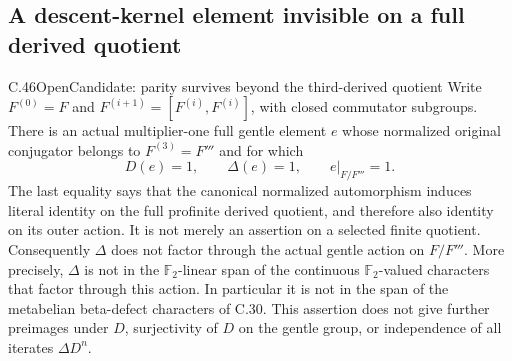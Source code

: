 \subsection{A descent-kernel element invisible on a full derived quotient}

\begin{statement}{C.46}{Open}{Candidate: parity survives beyond the third-derived quotient}
Write $F^{(0)}=F$ and $F^{(i+1)}=[F^{(i)},F^{(i)}]$, with
closed commutator subgroups. There is an actual multiplier-one full
gentle element $e$ whose normalized original conjugator belongs to
$F^{(3)}=F'''$ and for which
\[
 D(e)=1,\qquad \Delta(e)=1,\qquad
 e|_{F/F'''}=1.                                      \tag{C.46.1}
\]
The last equality says that the canonical normalized automorphism induces
literal identity on the full profinite derived quotient, and therefore
also identity on its outer action. It is not merely an assertion on a
selected finite quotient. Consequently $\Delta$ does not factor through
the actual gentle action on $F/F'''$. More precisely, $\Delta$ is not
in the $\mathbb F_2$-linear span of the continuous $\mathbb F_2$-valued
characters that factor through this action. In particular it is not
in the span of the metabelian beta-defect characters
of C.30. This assertion does not give further preimages under $D$,
surjectivity of $D$ on the gentle group, or independence of all iterates
$\Delta D^n$.
\end{statement}

